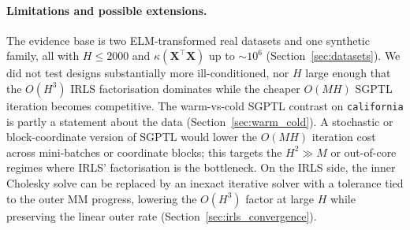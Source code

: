 \paragraph{Limitations and possible extensions.}
The evidence base is two ELM-transformed real datasets and one
synthetic family, all with $H\le 2000$ and
$\kappa(\mathbf{X}^{\top}\mathbf{X})$ up to $\sim 10^{6}$
(Section~\ref{sec:datasets}). We did not test designs substantially
more ill-conditioned, nor $H$ large enough that the $O(H^{3})$ IRLS
factorisation dominates while the cheaper $O(MH)$ SGPTL iteration
becomes competitive. The warm-vs-cold SGPTL contrast on
\texttt{california} is partly a statement about the data
(Section~\ref{sec:warm_cold}). A stochastic or block-coordinate
version of SGPTL would lower the $O(MH)$ iteration cost across
mini-batches or coordinate blocks; this targets the
$H^{2}\!\gg\!M$ or out-of-core regimes where IRLS' factorisation is
the bottleneck. On the IRLS side, the inner Cholesky solve can be
replaced by an inexact iterative solver with a tolerance tied to the
outer MM progress, lowering the $O(H^{3})$ factor at large $H$ while
preserving the linear outer rate
(Section~\ref{sec:irls_convergence}).
